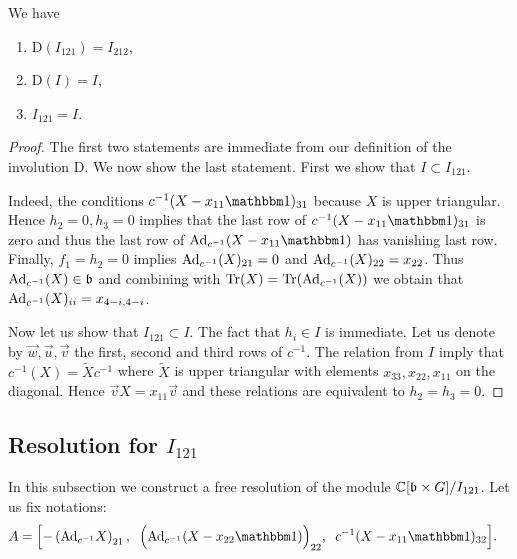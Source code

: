 \begin{proposition}\label{prop: ideals aux} We have
\begin{enumerate}
\item $\mathrm{D}(I_{121})=I_{212}$,
\item $\mathrm{D}(I)=I$,
\item $I_{121}=I$.
\end{enumerate}
\end{proposition}
\begin{proof}
The first two statements are immediate from our definition of the involution $\mathrm{D}$. We now show the last statement. First we show that $I\subset I_{121}$.

Indeed, the conditions $c^{-1}(X-x_{11}\xId)_{31}$ because $X$ is upper triangular. Hence $h_2=0,h_3=0$ implies that the last row of $c^{-1}(X-x_{11}\xId)_{31}$ is zero and
thus the last row of $\Ad_{c^{-1}}(X-x_{11}\xId)$ has vanishing last row. Finally, $f_1=h_2=0$ implies ${\rm Ad}_{c^{-1}}(X)_{21}=0$ and ${\rm Ad}_{c^{-1}}(X)_{22}=x_{22}$.
Thus ${\rm Ad}_{c^{-1}}(X)\in \mathfrak{b} $ and combining with $\mathop{{\rm Tr}}\nolimits(X)=\mathop{{\rm Tr}}\nolimits({\rm Ad}_{c^{-1}}(X))$ we obtain that ${\rm Ad}_{c^{-1}}(X)_{ii}=x_{4-i,4-i}$.

Now let us show that $I_{121}\subset I$. The fact that $h_i\in I$ is immediate. Let us denote by $\vec{w},\vec{u},\vec{v}$ the first, second and third rows of $c^{-1}$.
The relation from $I$ imply that  $c^{-1}(X)=\tilde{X} c^{-1}$ where $\tilde{X}$ is upper triangular with elements $x_{33},x_{22},x_{11}$ on the diagonal. Hence
$\vec{v}X=x_{11}\vec{v}$ and these relations are equivalent to $h_2=h_3=0$.
\end{proof}



\subsection{Resolution for $I_{121}$}
In this subsection we construct a free resolution of the module $\mathbb{C}[\mathfrak{b}\times G]/I_{121}$. Let us fix notations:
\begin{align*}
A&=\Bigl[-\left(\Adv{c^{-1}}\xX\right)_{21},\;\;
  \Bigl(\Adv{c^{-1}}(\xX-\xtt\xId)\Bigr)_{22},\;\;
 c^{-1}(\xX - \xoo\xId)_{32}
\Bigr].
\end{align*}

